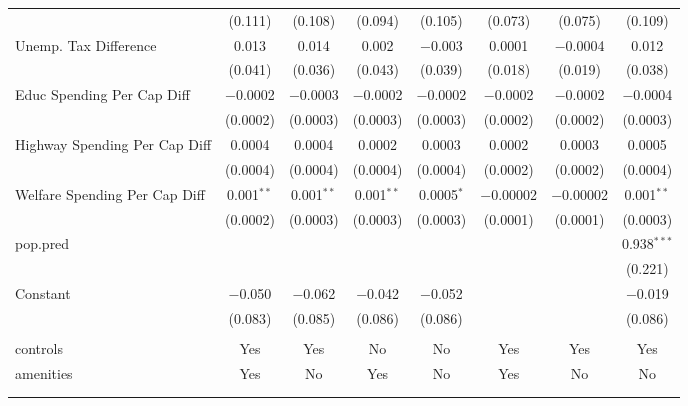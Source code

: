 \begin{table}[!htbp]
\begin{tabular}{@{\extracolsep{5pt}}lccccccc}
  & (0.111) & (0.108) & (0.094) & (0.105) & (0.073) & (0.075) & (0.109) \\ 
  Unemp. Tax Difference & 0.013 & 0.014 & 0.002 & $-$0.003 & 0.0001 & $-$0.0004 & 0.012 \\ 
  & (0.041) & (0.036) & (0.043) & (0.039) & (0.018) & (0.019) & (0.038) \\ 
  Educ Spending Per Cap Diff & $-$0.0002 & $-$0.0003 & $-$0.0002 & $-$0.0002 & $-$0.0002 & $-$0.0002 & $-$0.0004 \\ 
  & (0.0002) & (0.0003) & (0.0003) & (0.0003) & (0.0002) & (0.0002) & (0.0003) \\ 
  Highway Spending Per Cap Diff & 0.0004 & 0.0004 & 0.0002 & 0.0003 & 0.0002 & 0.0003 & 0.0005 \\ 
  & (0.0004) & (0.0004) & (0.0004) & (0.0004) & (0.0002) & (0.0002) & (0.0004) \\ 
  Welfare Spending Per Cap Diff & 0.001$^{**}$ & 0.001$^{**}$ & 0.001$^{**}$ & 0.0005$^{*}$ & $-$0.00002 & $-$0.00002 & 0.001$^{**}$ \\ 
  & (0.0002) & (0.0003) & (0.0003) & (0.0003) & (0.0001) & (0.0001) & (0.0003) \\ 
  pop.pred &  &  &  &  &  &  & 0.938$^{***}$ \\ 
  &  &  &  &  &  &  & (0.221) \\ 
  Constant & $-$0.050 & $-$0.062 & $-$0.042 & $-$0.052 &  &  & $-$0.019 \\ 
  & (0.083) & (0.085) & (0.086) & (0.086) &  &  & (0.086) \\ 
 \hline \\[-1.8ex] 
controls & Yes & Yes & No & No & Yes & Yes & Yes \\ 
amenities & Yes & No & Yes & No & Yes & No & No \\ 
\hline \\[-1.8ex] 
\hline 
\hline \\[-1.8ex] 
\end{tabular} 
\end{table} 
